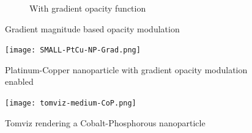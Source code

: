\begin{figure}[ht]
\begin{subfigure}[b]{0.5\columnwidth}
    \caption{With gradient opacity function}
    \label{fig:Ng2}
  \end{subfigure}
  \caption{Gradient magnitude based opacity modulation}
  \label{fig:gradient}
\end{figure}

\begin{figure}[ht]
  \centering
  \texttt{[image: SMALL-PtCu-NP-Grad.png]}
  \caption{Platinum-Copper nanoparticle with gradient opacity modulation enabled}
  \label{fig:ptcu-grad}
\end{figure}

\begin{figure}[ht]
  \centering
  \texttt{[image: tomviz-medium-CoP.png]}
  \caption{Tomviz\protect\cite{marcus_hanwell_tomviz_2014} rendering a
  Cobalt-Phosphorous nanoparticle}
  \label{fig:tomviz-cop}
\end{figure}
